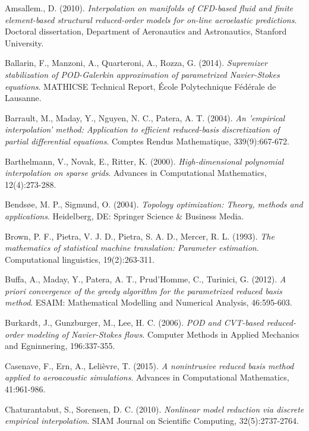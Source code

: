 \documentclass{elsarticle}
\numberwithin{equation}{section}
\theoremstyle{theorem}
\theoremstyle{definition}
\theoremstyle{remark}
\theoremstyle{proposition}
\numberwithin{figure}{section}
\begin{document}
	\begin{thebibliography}{50}
		
		Amsallem., D. (2010). \emph{Interpolation on manifolds of CFD-based fluid and finite element-based structural reduced-order models for on-line aeroelastic predictions}. Doctoral dissertation, Department of Aeronautics and Astronautics, Stanford University.
		
		Ballarin, F., Manzoni, A., Quarteroni, A., Rozza, G. (2014). \emph{Supremizer stabilization of POD-Galerkin approximation of parametrized Navier-Stokes equations}. MATHICSE Technical Report, \'Ecole Polytechnique F\'ed\'erale de Lausanne.
	
		Barrault, M., Maday, Y., Nguyen, N. C., Patera, A. T. (2004). \emph{An 'empirical interpolation' method: Application to efficient reduced-basis discretization of partial differential equations}. Comptes Rendus Mathematique, 339(9):667-672.
		
		Barthelmann, V., Novak, E., Ritter, K. (2000). \emph{High-dimensional polynomial interpolation on sparse grids}. Advances in Computational Mathematics, 12(4):273-288.
		
		Bends\o{}e, M. P., Sigmund, O. (2004). \emph{Topology optimization: Theory, methods and applications}. Heidelberg, DE: Springer Science \& Business Media. 
		
		Brown, P. F., Pietra, V. J. D., Pietra, S. A. D., Mercer, R. L. (1993). \emph{The mathematics of statistical machine translation: Parameter estimation}. Computational linguistics, 19(2):263-311.
		
		Buffa, A., Maday, Y., Patera, A. T., Prud'Homme, C., Turinici, G. (2012). \emph{A priori convergence of the greedy algorithm for the parametrized reduced basis method}. ESAIM: Mathematical Modelling and Numerical Analysis, 46:595-603.
		
		Burkardt, J., Gunzburger, M., Lee, H. C. (2006). \emph{POD and CVT-based reduced-order modeling of Navier-Stokes flows}. Computer Methods in Applied Mechanics and Egninnering, 196:337-355.
		
		Casenave, F., Ern, A., Lelièvre, T. (2015). \emph{A nonintrusive reduced basis method applied to aeroacoustic simulations}. Advances in Computational Mathematics, 41:961-986.
		
		Chaturantabut, S., Sorensen, D. C. (2010). \emph{Nonlinear model reduction via discrete empirical interpolation}. SIAM Journal on Scientific Computing, 32(5):2737-2764.
		

\end{thebibliography}
\end{document}
